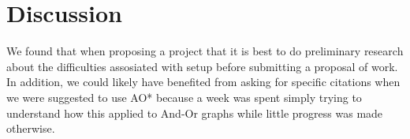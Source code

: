 \documentclass{article}
\begin{document}
\section{Discussion}
We found that when proposing a project that it is best to do preliminary research about the difficulties assosiated with setup before submitting a proposal of work. In addition, we could likely have benefited from asking for specific citations when we were suggested to use AO* because a week was spent simply trying to understand how this applied to And-Or graphs while little progress was made otherwise. 
\end{document}
